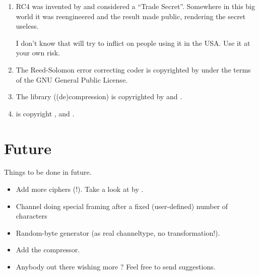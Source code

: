 \documentclass {report}
\begin{document}
\begin {enumerate}
	\begin {quotation}
		Blowfish is unpatented, and will remain so in all
		countries. The algorithm is hereby placed in the
		public domain, and can be freely used by anyone.
	\end {quotation}

\item	RC4 was invented by \rsadsi{} and considered a ``Trade
	Secret''. Somewhere in this big world it was reengineered and
	the result made public, rendering the secret useless.

	I don't know that \rsadsi{} will try to inflict on people using
	it in the USA. Use it at your own risk.

\item	The Reed-Solomon error correcting coder is copyrighted by
	\paulf{} under the terms of the GNU General Public License.

\item	The library \zlib{} ((de)compression) is copyrighted by
	\jlgailly{} and \madler.

\item	\rmd{} is copyright \dobbertin{}, \bosselaers{} and \preneel{}.
\end   {enumerate}


\chapter {Future}

Things to be done in future.

\begin {itemize}

\item	Add more ciphers (\PGP!). Take a look at \pgplib{} by
	\tage{}.


\item	Channel doing special framing after a fixed (user-defined)
	number of characters

\item	Random-byte generator (as real channeltype, no
	transformation!).


\item	Add the  compressor.

\item	Anybody out there wishing more ? Feel free to send \me{}
	suggestions.
\end   {itemize}


\printindex
\end{document}
